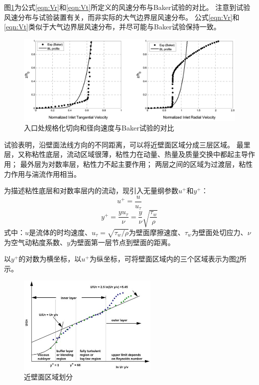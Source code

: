 图\ref{fig:bc-inlet}为公式\eqref{eqn:Vr}和\eqref{eqn:Vt}所定义的风速分布与Baker\cite{baker1981boundary}试验的对比。
注意到试验风速分布与试验装置有关，而非实际的大气边界层风速分布。
公式\eqref{eqn:Vr}和\eqref{eqn:Vt}类似于大气边界层风速分布，并尽可能与Baker\cite{baker1981boundary}试验保持一致。
\begin{figure}[!htbp]
  \centering
  \includegraphics[width=\textwidth]{tornado-simulation/fig/bc_inlet.png}
  \caption{入口处规格化切向和径向速度与Baker\cite{baker1981boundary}试验的对比}
  \label{fig:bc-inlet}
\end{figure}

试验表明，沿壁面法线方向的不同距离，可以将近壁面区域分成三层区域。
最里层，又称粘性底层，流动区域很薄，粘性力在动量、热量及质量交换中都起主导作用；
最外层为对数率层，粘性力不起主要作用；
两层之间的区域为过渡层，粘性力作用与湍流作用相当。

为描述粘性底层和对数率层内的流动，现引入无量纲参数$u^{+}$和$y^{+}$：
\begin{equation}
  u^{+} = \frac{u}{u_{\tau}}
\end{equation}
\begin{equation}
  y^{+} = \frac{y u_{\tau}}{\nu} = \frac{y}{\nu} \sqrt{\frac{\tau_w}{\rho}}
\end{equation}
式中：$u$是流体的时均速度、$u_{\tau}=\sqrt{\tau_w/\rho}$为壁面摩擦速度、$\tau_w$为壁面处切应力、$\nu$为空气动粘度系数、$y$为壁面第一层节点到壁面的距离。

以$y^{+}$的对数为横坐标，以$u^{+}$为纵坐标，可将壁面区域内的三个区域表示为图\ref{fig:uplus}所示\cite{fluent2015theory}。
\begin{figure}[!htbp]
  \centering
  \includegraphics[width=0.6\textwidth]{tornado-simulation/fig/uplus.jpg}
  \caption{近壁面区域划分}\label{fig:uplus}
\end{figure}

